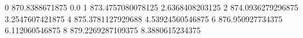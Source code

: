 0 870.8388671875 0.0
1 873.4757080078125 2.6368408203125
2 874.0936279296875 3.2547607421875
4 875.3781127929688 4.53924560546875
6 876.950927734375 6.112060546875
8 879.2269287109375 8.3880615234375
